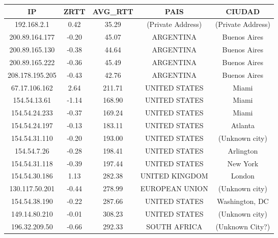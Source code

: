 \begin{tabular}{|c@{\hspace{5ex}}c@{\hspace{5ex}}c@{\hspace{5ex}}c@{\hspace{5ex}}c|}
 \hline
 \rule{0pt}{1.2em}IP & ZRTT & AVG\_RTT & PAIS & CIUDAD\\[0.2em]
 \hline

\rule{0pt}{1.2em} 192.168.2.1  &  0.42 & 35.29 & (Private Address) & (Private Address) \\[0.2em]
\rule{0pt}{1.2em} 200.89.164.177  &  -0.20 & 45.07 & ARGENTINA & Buenos Aires \\[0.2em]
\rule{0pt}{1.2em} 200.89.165.130  &  -0.38 & 44.64 & ARGENTINA & Buenos Aires \\[0.2em]
\rule{0pt}{1.2em} 200.89.165.222  &  -0.36 & 45.49 & ARGENTINA & Buenos Aires \\[0.2em]
\rule{0pt}{1.2em} 208.178.195.205  &  -0.43 & 42.76 & ARGENTINA & Buenos Aires \\[0.2em]
\rule{0pt}{1.2em} 67.17.106.162  &  2.64 & 211.71 & UNITED STATES & Miami \\[0.2em]
\rule{0pt}{1.2em} 154.54.13.61  &  -1.14 & 168.90 & UNITED STATES & Miami \\[0.2em]
\rule{0pt}{1.2em} 154.54.24.233  &  -0.37 & 169.24 & UNITED STATES & Miami \\[0.2em]
\rule{0pt}{1.2em} 154.54.24.197  &  -0.13 & 183.11 & UNITED STATES & Atlanta \\[0.2em]
\rule{0pt}{1.2em} 154.54.31.110  &  -0.20 & 193.00 & UNITED STATES & (Unknown city) \\[0.2em]
\rule{0pt}{1.2em} 154.54.7.26  &  -0.28 & 198.41 & UNITED STATES & Arlington \\[0.2em]
\rule{0pt}{1.2em} 154.54.31.118  &  -0.39 & 197.44 & UNITED STATES & New York \\[0.2em]
\rule{0pt}{1.2em} 154.54.30.186  &  1.13 & 282.38 & UNITED KINGDOM & London \\[0.2em]
\rule{0pt}{1.2em} 130.117.50.201  &  -0.44 & 278.99 & EUROPEAN UNION & (Unknown city) \\[0.2em]
\rule{0pt}{1.2em} 154.54.38.190  &  -0.22 & 287.66 & UNITED STATES & Washington, DC \\[0.2em]
\rule{0pt}{1.2em} 149.14.80.210  &  -0.01 & 308.23  & UNITED STATES & (Unknown city) \\[0.2em]
\rule{0pt}{1.2em} 196.32.209.50  &  -0.66 & 292.33 & SOUTH AFRICA & (Unknown City?) \\[0.2em]

\end{tabular}
